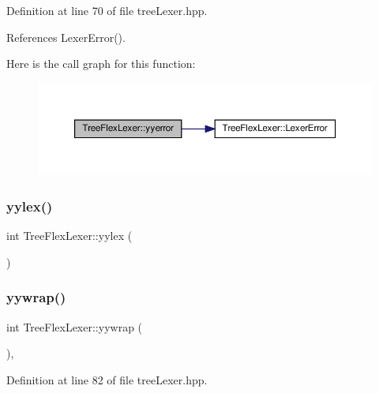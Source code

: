 Definition at line 70 of file tree\+Lexer.\+hpp.



References Lexer\+Error().

Here is the call graph for this function\+:
\nopagebreak
\begin{figure}[H]
\begin{center}
\leavevmode
\includegraphics[width=350pt]{d8/d95/structTreeFlexLexer_a71d99188f7a9917d25163f47743a8a44_cgraph}
\end{center}
\end{figure}
\mbox{\label{structTreeFlexLexer_a3853cf6be8499de76166b76e7257975d}} 
\subsubsection{\texorpdfstring{yylex()}{yylex()}}
{\footnotesize\ttfamily int Tree\+Flex\+Lexer\+::yylex (\begin{DoxyParamCaption}{ }\end{DoxyParamCaption})\hspace{0.3cm}{\ttfamily [override]}}

\mbox{\label{structTreeFlexLexer_a0c480d7a6b1104d8a863792b911f7253}} 
\subsubsection{\texorpdfstring{yywrap()}{yywrap()}}
{\footnotesize\ttfamily int Tree\+Flex\+Lexer\+::yywrap (\begin{DoxyParamCaption}{ }\end{DoxyParamCaption})\hspace{0.3cm}{\ttfamily [inline]}, {\ttfamily [override]}}



Definition at line 82 of file tree\+Lexer.\+hpp.



